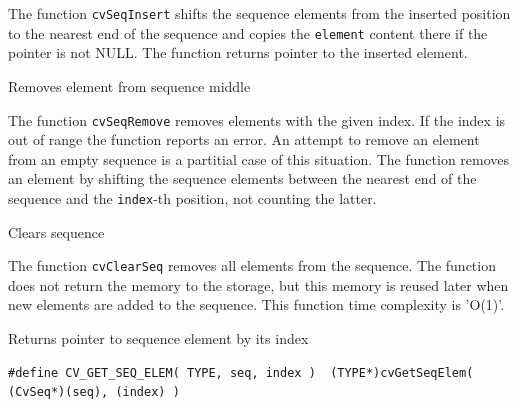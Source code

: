 The function \texttt{cvSeqInsert} shifts the sequence elements from the inserted position to the nearest end of the sequence and copies the \texttt{element} content there if the pointer is not NULL. The function returns pointer to the inserted element.

\label{SeqRemove}

Removes element from sequence middle


\begin{description}
\end{description}


The function \texttt{cvSeqRemove} removes elements with the given
index. If the index is out of range the function reports an error. An
attempt to remove an element from an empty sequence is a partitial
case of this situation. The function removes an element by shifting
the sequence elements between the nearest end of the sequence and the
\texttt{index}-th position, not counting the latter.


\label{ClearSeq}

Clears sequence


\begin{description}
\end{description}


The function \texttt{cvClearSeq} removes all elements from the
sequence. The function does not return the memory to the storage, but this
memory is reused later when new elements are added to the sequence. This
function time complexity is 'O(1)'.

\label{GetSeqElem}

Returns pointer to sequence element by its index


\begin{lstlisting}
#define CV_GET_SEQ_ELEM( TYPE, seq, index )  (TYPE*)cvGetSeqElem( (CvSeq*)(seq), (index) )
\end{lstlisting}

